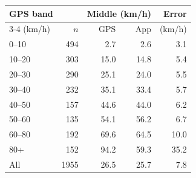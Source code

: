 \begin{tabular}{@{}lrrrr@{}}
\toprule
GPS band & & \multicolumn{2}{c}{Middle (km/h)} & Error\\
\cmidrule(lr){3-4}
(km/h) & $n$ & GPS & App & (km/h)\\
\midrule
0--10 & 494 & 2.7 & 2.6 & 3.1 \\
10--20 & 303 & 15.0 & 14.8 & 5.4 \\
20--30 & 290 & 25.1 & 24.0 & 5.5 \\
30--40 & 232 & 35.1 & 33.4 & 5.7 \\
40--50 & 157 & 44.6 & 44.0 & 6.2 \\
50--60 & 135 & 54.1 & 56.2 & 6.7 \\
60--80 & 192 & 69.6 & 64.5 & 10.0 \\
80+ & 152 & 94.2 & 59.3 & 35.2 \\
\midrule
All & 1955 & 26.5 & 25.7 & 7.8 \\
\bottomrule
\end{tabular}
